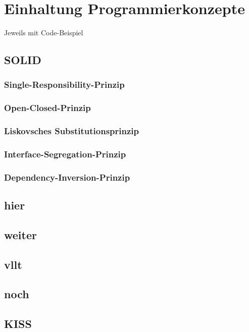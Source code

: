 
\section{Einhaltung Programmierkonzepte}

Jeweils mit Code-Beispiel

\subsection{SOLID}
\subsubsection{Single-Responsibility-Prinzip}
\subsubsection{Open-Closed-Prinzip}
\subsubsection{Liskovsches Substitutionsprinzip}
\subsubsection{Interface-Segregation-Prinzip}
\subsubsection{Dependency-Inversion-Prinzip}

\subsection{hier}
\subsection{weiter}
\subsection{vllt}
\subsection{noch}
\subsection{KISS}